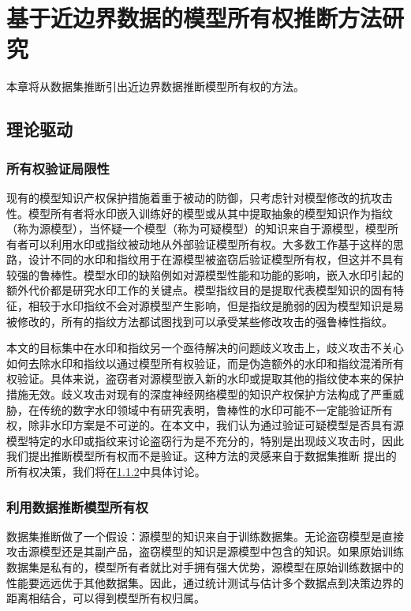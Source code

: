 
\chapter{基于近边界数据的模型所有权推断方法研究}\label{4}

本章将从数据集推断引出近边界数据推断模型所有权的方法。

\section{理论驱动}\label{4.1}

\subsection{所有权验证局限性}

现有的模型知识产权保护措施着重于被动的防御，只考虑针对模型修改的抗攻击性。模型所有者将水印嵌入训练好的模型或从其中提取抽象的模型知识作为指纹（称为源模型），当怀疑一个模型（称为可疑模型）的知识来自于源模型，模型所有者可以利用水印或指纹被动地从外部验证模型所有权。大多数工作基于这样的思路，设计不同的水印和指纹用于在源模型被盗窃后验证模型所有权，但这并不具有较强的鲁棒性。模型水印的缺陷例如对源模型性能和功能的影响，嵌入水印引起的额外代价都是研究水印工作的关键点。模型指纹目的是提取代表模型知识的固有特征，相较于水印指纹不会对源模型产生影响，但是指纹是脆弱的因为模型知识是易被修改的，所有的指纹方法都试图找到可以承受某些修改攻击的强鲁棒性指纹。

本文的目标集中在水印和指纹另一个亟待解决的问题歧义攻击上，歧义攻击不关心如何去除水印和指纹以通过模型所有权验证，而是伪造额外的水印和指纹混淆所有权验证。具体来说，盗窃者对源模型嵌入新的水印或提取其他的指纹使本来的保护措施无效。歧义攻击对现有的深度神经网络模型的知识产权保护方法构成了严重威胁，在传统的数字水印领域中有研究表明，鲁棒性的水印可能不一定能验证所有权，除非水印方案是不可逆的\cite{fan2019rethinking}。在本文中，我们认为通过验证可疑模型是否具有源模型特定的水印或指纹来讨论盗窃行为是不充分的，特别是出现歧义攻击时，因此我们提出推断模型所有权而不是验证。这种方法的灵感来自于数据集推断\cite{maini2021dataset} 提出的所有权决策，我们将在\ref{4.1.2}中具体讨论。

\subsection{利用数据推断模型所有权}\label{4.1.2}

数据集推断做了一个假设：源模型的知识来自于训练数据集。无论盗窃模型是直接攻击源模型还是其副产品，盗窃模型的知识是源模型中包含的知识。如果原始训练数据集是私有的，模型所有者就比对手拥有强大优势，源模型在原始训练数据中的性能要远远优于其他数据集。因此，通过统计测试与估计多个数据点到决策边界的距离相结合，可以得到模型所有权归属。

